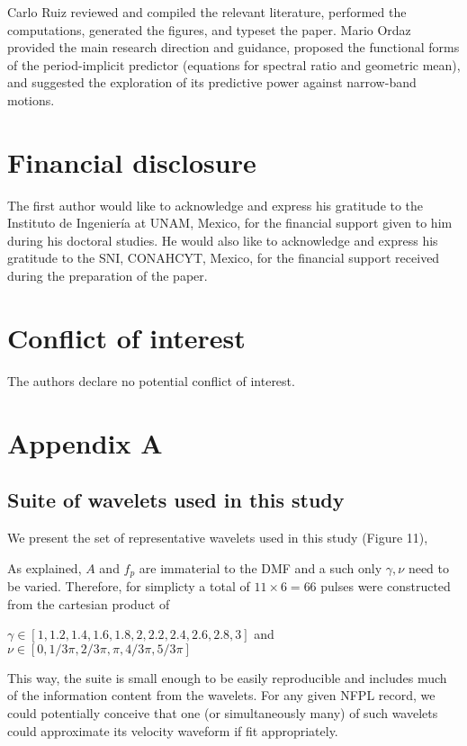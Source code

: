 Carlo Ruiz reviewed and compiled the relevant literature, performed the
computations, generated the figures, and typeset the paper. Mario Ordaz
provided the main research direction and guidance, proposed the
functional forms of the period-implicit predictor (equations for
spectral ratio and geometric mean), and suggested the exploration of its
predictive power against narrow-band motions.

\section{Financial disclosure}\label{financial-disclosure}

The first author would like to acknowledge and express his gratitude to
the Instituto de Ingeniería at UNAM, Mexico, for the financial support
given to him during his doctoral studies. He would also like to
acknowledge and express his gratitude to the SNI, CONAHCYT, Mexico, for
the financial support received during the preparation of the paper.

\section{Conflict of interest}\label{conflict-of-interest}

The authors declare no potential conflict of interest.

\section{Appendix A}\label{appendix-a}

\subsection{Suite of wavelets used in this
study}\label{suite-of-wavelets-used-in-this-study}

We present the set of representative wavelets used in this study (Figure
11),

As explained, \(A\) and \(f_p\) are immaterial to the DMF and a such
only \(\gamma, \nu\) need to be varied. Therefore, for simplicty a total
of \(11\times 6=66\) pulses were constructed from the cartesian product
of

\(\gamma \in [ 1, 1.2, 1.4, 1.6, 1.8, 2, 2.2, 2.4, 2.6, 2.8, 3]\) and
\(\nu \in [0, 1/3 \pi, 2/3 \pi, \pi, 4/3 \pi, 5/3 \pi ]\)

This way, the suite is small enough to be easily reproducible and
includes much of the information content from the wavelets. For any
given NFPL record, we could potentially conceive that one (or
simultaneously many) of such wavelets could approximate its velocity
waveform if fit appropriately.

